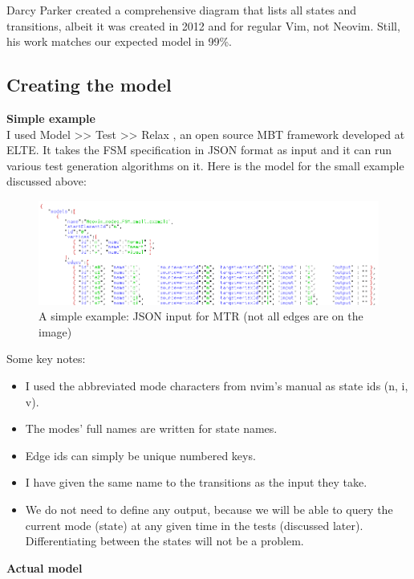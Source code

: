 \documentclass[12pt]{article}
\begin{document}
		Darcy Parker created a comprehensive diagram \cite{darcy-parker-diagram} that lists all states and transitions, albeit it was created in 2012 and for regular Vim, not Neovim. Still, his work matches our expected model in 99\%.

	\subsection{Creating the model}

		\textbf{Simple example}\\

		I used Model >> Test >> Relax \cite{relax}, an open source MBT framework developed at ELTE. It takes the FSM specification in JSON format as input and it can run various test generation algorithms on it. Here is the model for the small example discussed above:

		\begin{figure}[h]
			\centering
			\includegraphics[width=1\textwidth]{images/Neovim_modes_FSM_small_example_partial.png}
			\caption{A simple example: JSON input for MTR (not all edges are on the image)}
		\end{figure}

		Some key notes:
		\begin{itemize}
			\item{I used the abbreviated mode characters from nvim's manual as state ids (n, i, v).}
			\item{The modes' full names are written for state names.}
			\item{Edge ids can simply be unique numbered keys.}
			\item{I have given the same name to the transitions as the input they take.}
			\item{We do not need to define any output, because we will be able to query the current mode (state) at any given time in the tests (discussed later). Differentiating between the states will not be a problem.}
		\end{itemize}

		{\parindent0pt
		\textbf{Actual model}\\
		}
\end{document}
